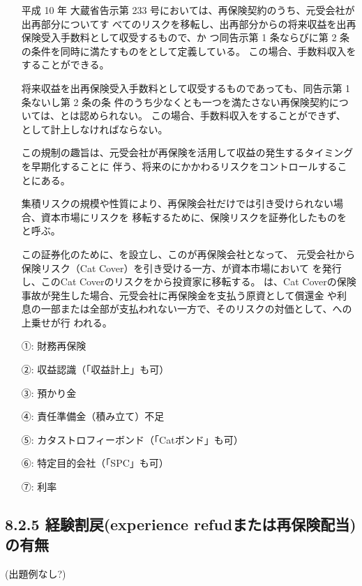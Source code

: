 \documentclass[report,gutter=10mm,fore-edge=10mm,uplatex,dvipdfmx]{jlreq}
\begin{document}
\begin{itemize}
\item[] 平成 10 年 大蔵省告示第 233 号においては、再保険契約のうち、元受会社が出再部分についてす
 べてのリスクを移転し、出再部分からの将来収益を出再保険受入手数料として収受するもので、か
 つ同告示第 1 条ならびに第 2 条の条件を同時に満たすものをとして定義している。
 この場合、手数料収入をすることができる。

\item[] 将来収益を出再保険受入手数料として収受するものであっても、同告示第 1 条ないし第 2 条の条
 件のうち少なくとも一つを満たさない再保険契約については、とは認められない。
 この場合、手数料収入をすることができず、
 として計上しなければならない。

\item[] この規制の趣旨は、元受会社が再保険を活用して収益の発生するタイミングを早期化することに
 伴う、将来のにかかわるリスクをコントロールすることにある。

\item[] 集積リスクの規模や性質により、再保険会社だけでは引き受けられない場合、資本市場にリスクを
 移転するために、保険リスクを証券化したものをと呼ぶ。

\item[] この証券化のために、を設立し、このが再保険会社となって、
 元受会社から保険リスク（Cat Cover）を引き受ける一方、が資本市場において
 を発行し、このCat Coverのリスクをから投資家に移転する。
 は、Cat Coverの保険事故が発生した場合、元受会社に再保険金を支払う原資として償還金
 や利息の一部または全部が支払われない一方で、そのリスクの対価として、への上乗せが行
 われる。
\end{itemize}

\answer{}
\begin{itemize}
\item[ ①: ] 財務再保険
\item[ ②: ] 収益認識（「収益計上」も可）
\item[ ③: ] 預かり金
\item[ ④: ] 責任準備金（積み立て）不足
\item[ ⑤: ] カタストロフィーボンド（「Catボンド」も可）
\item[ ⑥: ] 特定目的会社（「SPC」も可）
\item[ ⑦: ] 利率
\end{itemize}
\subsection{8.2.5 経験割戻(experience refudまたは再保険配当)の有無}
(出題例なし?)
\end{document}
